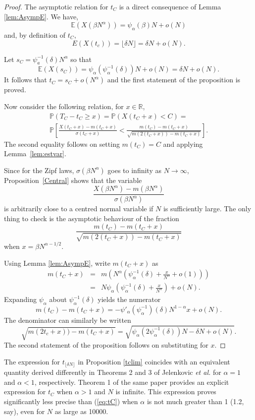 \documentclass{amsart}
\def\R{{\mathbb R}}
\def\P{{\mathbb P}}
\def\E{{\mathbb E}}
\def\etal{{\em et al. }}
\begin{document}
\begin{proof}
The asymptotic relation for $t_C$ is a direct consequence of  Lemma \ref{lem:AsympE}. We have,
$$\E(X(\beta N^{\alpha}))= \psi_{\alpha}(\beta)N+o(N)$$ 
and, by definition of $t_C$,
$$E(X(t_c))=\lfloor \delta N \rfloor = \delta N + o(N).$$

Let $s_C=\psi_a^{-1}(\delta)N^{\alpha}$ so that 
$$\E(X(s_C))=\psi_{\alpha}(\psi_{\alpha}^{-1}(\delta)) N +o(N)=\delta N + o(N).$$
It follows that $t_C =s_C+o(N^{\alpha}) $ and the first statement of the proposition is proved.

Now consider the following relation, for $x\in\R$,
\begin{multline*}
\P(T_C-t_C\geq x)=\P(X(t_C+x)<C )=\\\P\left[\frac{X(t_C{+}x){-}m(t_C{+}x)}{\sigma(t_C{+}x)}{<}\frac{m(t_C){-}m(t_C{+}x)}{\sqrt{m(2(t_C{+}x)){-}m(t_C{+}x)}}\right].
\end{multline*}
The second equality follows on setting $m(t_C)=C$ and applying Lemma~\ref{lem:estvar}. 

Since for the Zipf laws, $\sigma(\beta N^\alpha)$ goes to infinity as $N\to \infty$, Proposition~\ref{Central} shows that the variable
\[
\frac{X(\beta N^\alpha)-m(\beta N^\alpha)}{\sigma(\beta N^\alpha)}
\]
is arbitrarily close to a centred normal variable if $N$ is sufficiently large. The only thing to check is the asymptotic behaviour of the fraction
\[
\frac{m(t_C)-m(t_C+x)}{\sqrt{m(2(t_C+x))-m(t_C+x)}}
\]
when $x=\beta N^{\alpha-1/2}$. 

Using Lemma \ref{lem:AsympE}, write $m(t_C+x)$ as
\begin{eqnarray*}
m(t_C+x) & = & m\left(N^{\alpha}(\psi_{\alpha}^{-1}(\delta)+\frac{x}{N^{\alpha}}+o(1))\right) \\
                 & = & N \psi_{\alpha}\left(\psi_{\alpha}^{-1}(\delta)+\frac{x}{N^{\alpha}} \right) + o(N).
\end{eqnarray*}
Expanding $\psi_{\alpha}$ about $\psi_{\alpha}^{-1}(\delta)$ yields the numerator 
$$ m(t_C) - m(t_C+x) = - \psi'_{\alpha}(\psi_{\alpha}^{-1})(\delta)N^{1-\alpha} x + o(N).$$
The denominator can similarly be written
$$\sqrt{m(2t_c+x))-m(t_C+x)} = \sqrt{\psi_{\alpha}(2\psi_{\alpha}^{-1}(\delta))N -\delta N+ o(N)}.$$
The second statement of the proposition follows on substituting for $x$. 

\end{proof}

\vspace{2mm}
 The expression for $t_{\lfloor \delta N\rfloor}$ in Proposition \ref{tclim} coincides with an equivalent quantity derived differently in Theorems 2 and 3 of Jelenkovic \etal   \cite{JKR05} for $\alpha=1$ and $\alpha<1$, respectively. Theorem 1 of the same paper provides an explicit expression for $t_C$ when $\alpha>1$ and $N$ is infinite. This expression proves significantly less precise than (\ref{eq:tC}) when $\alpha$ is not much greater than 1 (1.2, say), even for $N$ as large as 10000.
\end{document}

